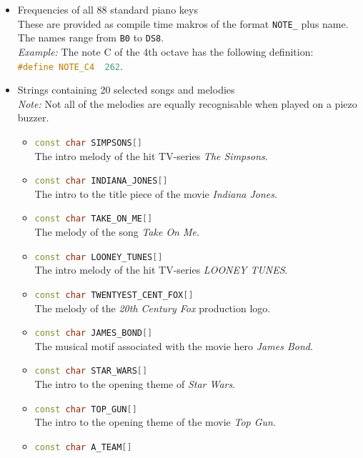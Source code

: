 \documentclass{report}
\begin{document}
\begin{itemize}
	\item Frequencies of all 88 standard piano keys \\
		These are provided as compile time makros of the format \lstinline{NOTE_} plus name. The names range from \lstinline{B0} to \lstinline{DS8}. \\
		\emph{Example:} The note C of the 4th octave has the following definition: \\
		\lstinline[language=c++]{#define NOTE_C4  262}.
	\item Strings containing 20 selected songs and melodies \\
		\emph{Note:} Not all of the melodies are equally recognisable when played on a piezo buzzer.
		\begin{itemize}
			\item \lstinline[language=c++]{const char SIMPSONS[]} \\
				The intro melody of the hit TV-series \emph{The Simpsons}.
			\item \lstinline[language=c++]{const char INDIANA_JONES[]} \\
				The intro to the title piece of the movie \emph{Indiana Jones}.
			\item \lstinline[language=c++]{const char TAKE_ON_ME[]} \\
				The melody of the song \emph{Take On Me}.
			\item \lstinline[language=c++]{const char LOONEY_TUNES[]} \\
				The intro melody of the hit TV-series \emph{LOONEY TUNES}.
			\item \lstinline[language=c++]{const char TWENTYEST_CENT_FOX[]} \\
				The melody of the \emph{20th Century Fox} production logo.
			\item \lstinline[language=c++]{const char JAMES_BOND[]} \\
				The musical motif associated with the movie hero \emph{James Bond}.
			\item \lstinline[language=c++]{const char STAR_WARS[]} \\
				The intro to the opening theme of \emph{Star Wars}.
			\item \lstinline[language=c++]{const char TOP_GUN[]} \\
				The intro to the opening theme of the movie \emph{Top Gun}.
			\item \lstinline[language=c++]{const char A_TEAM[]} \\

\end{itemize}
\end{itemize}
\end{document}
